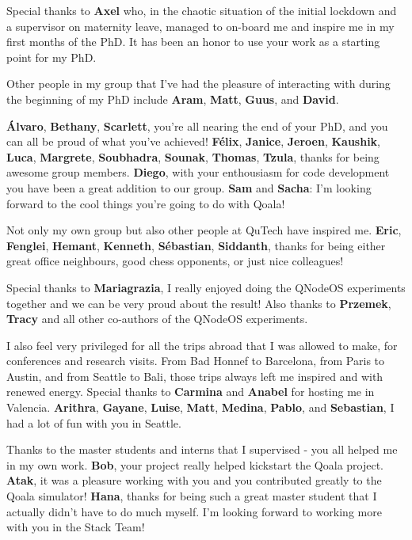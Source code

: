 Special thanks to \textbf{Axel} who, in the chaotic situation of the initial lockdown and a supervisor on maternity leave, managed to on-board me and inspire me in my first months of the PhD.
It has been an honor to use your work as a starting point for my PhD.

Other people in my group that I've had the pleasure of interacting with during the beginning of my PhD include
\textbf{Aram}, \textbf{Matt}, \textbf{Guus}, and \textbf{David}.

\textbf{\'Alvaro}, \textbf{Bethany}, \textbf{Scarlett}, you're all nearing the end of your PhD, and you can all be proud of what you've achieved!
\textbf{F\'elix}, \textbf{Janice}, \textbf{Jeroen}, \textbf{Kaushik}, \textbf{Luca}, \textbf{Margrete}, \textbf{Soubhadra}, \textbf{Sounak}, \textbf{Thomas}, \textbf{Tzula}, thanks for being awesome group members.
\textbf{Diego}, with your enthousiasm for code development you have been a great addition to our group.
\textbf{Sam} and \textbf{Sacha}: I'm looking forward to the cool things you're going to do with Qoala!

Not only my own group but also other people at QuTech have inspired me.
\textbf{Eric}, \textbf{Fenglei}, \textbf{Hemant}, \textbf{Kenneth}, \textbf{S\'ebastian}, \textbf{Siddanth}, thanks for being either great office neighbours, good chess opponents, or just nice colleagues!

Special thanks to \textbf{Mariagrazia}, I really enjoyed doing the QNodeOS experiments together and we can be very proud about the result!
Also thanks to \textbf{Przemek}, \textbf{Tracy} and all other co-authors of the QNodeOS experiments.

I also feel very privileged for all the trips abroad that I was allowed to make, for conferences and research visits.
From Bad Honnef to Barcelona, from Paris to Austin, and from Seattle to Bali, those trips always left me inspired and with renewed energy.
Special thanks to \textbf{Carmina} and \textbf{Anabel} for hosting me in Valencia.
\textbf{Arithra}, \textbf{Gayane}, \textbf{Luise}, \textbf{Matt}, \textbf{Medina}, \textbf{Pablo}, and \textbf{Sebastian}, I had a lot of fun with you in Seattle.

Thanks to the master students and interns that I supervised - you all helped me in my own work.
\textbf{Bob}, your project really helped kickstart the Qoala project.
\textbf{Atak}, it was a pleasure working with you and you contributed greatly to the Qoala simulator!
\textbf{Hana}, thanks for being such a great master student that I actually didn't have to do much myself.
I'm looking forward to working more with you in the Stack Team!


